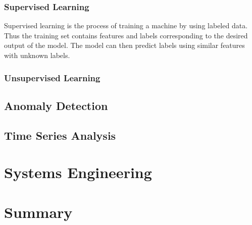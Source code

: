 \subsubsection{Supervised Learning}
Supervised learning is the process of training a machine by using labeled data. Thus the training set contains features and labels corresponding to the desired output of the model.  The model can then predict labels using similar features with unknown labels.  \cite{Ben-David2014UnderstandingAlgorithms}


\subsubsection{Unsupervised Learning}

\subsection{Anomaly Detection}


\subsection{Time Series Analysis}

\section{Systems Engineering}

\section{Summary}